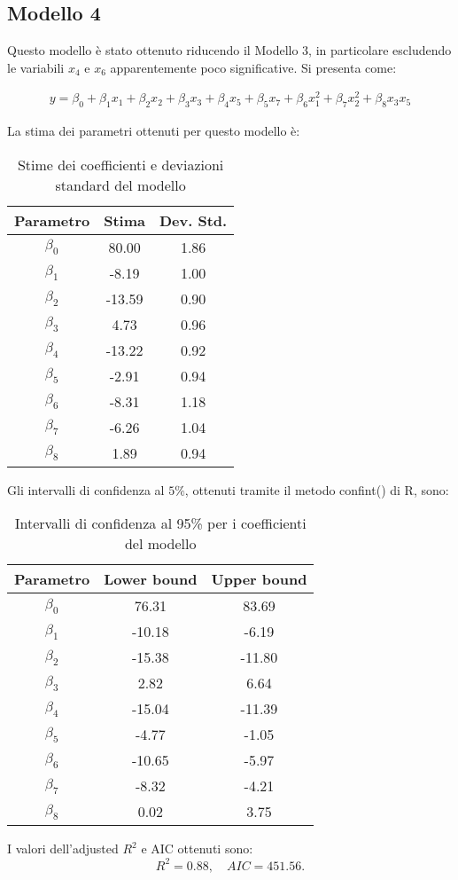 \subsection{Modello 4}
Questo modello è stato ottenuto riducendo il Modello 3, in particolare escludendo le variabili $x_4$ e $x_6$ apparentemente poco significative. Si presenta come:

\begin{align*}
	y = \beta_0 + \beta_1x_1 + \beta_2x_2 + \beta_3x_3 + \beta_4x_5 + \beta_5x_7 + \beta_6x_1^2 + \beta_7x_2^2 + \beta_8x_3x_5
\end{align*}


La stima dei parametri ottenuti per questo modello è:
\begin{table}[H]
	\centering
	\begin{tabular}{|c|c|c|}
		\hline
		\textbf{Parametro} & \textbf{Stima} & \textbf{Dev. Std.} \\
		\hline
		$\beta_0$   & 80.00  & 1.86 \\
		$\beta_1$   & -8.19  & 1.00 \\
		$\beta_2$   & -13.59 & 0.90 \\
		$\beta_3$   & 4.73   & 0.96 \\
		$\beta_4$   & -13.22  & 0.92 \\
		$\beta_5$   & -2.91 & 0.94 \\
		$\beta_6$   & -8.31   & 1.18 \\
		$\beta_7$   & -6.26  & 1.04 \\
		$\beta_8$   & 1.89  & 0.94 \\
		\hline
	\end{tabular}
	\caption{Stime dei coefficienti e deviazioni standard del modello}
	\label{tab:stima_coef_std}
\end{table}
Gli intervalli di confidenza al $5\%$, ottenuti tramite il metodo confint() di R, sono:
\begin{table}[H]
	\centering
	\begin{tabular}{|c|c|c|}
		\hline
		\textbf{Parametro} & \textbf{Lower bound} & \textbf{Upper bound} \\
		\hline
		$\beta_0$   & 76.31  & 83.69 \\
		$\beta_1$   & -10.18 & -6.19 \\
		$\beta_2$   & -15.38 & -11.80 \\
		$\beta_3$   & 2.82   & 6.64 \\
		$\beta_4$   & -15.04  & -11.39 \\
		$\beta_5$   & -4.77 & -1.05 \\
		$\beta_6$   & -10.65  & -5.97 \\
		$\beta_7$   & -8.32  & -4.21 \\
		$\beta_8$   & 0.02 & 3.75 \\
		\hline
	\end{tabular}
	\caption{Intervalli di confidenza al 95\% per i coefficienti del modello}
	\label{tab:ci_coefficienti}
\end{table}
I valori dell'adjusted $R^2$  e AIC ottenuti sono:
\begin{equation*}
	R^2 =      0.88, \quad AIC=451.56.
\end{equation*}


